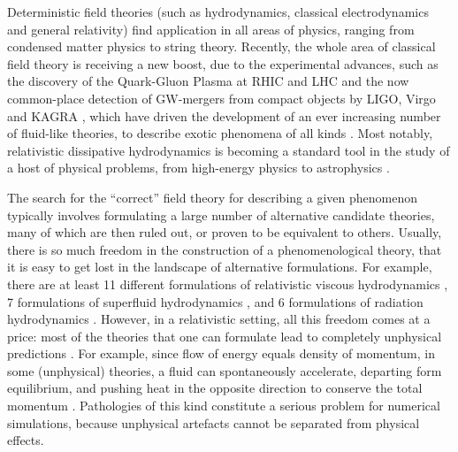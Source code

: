 \documentclass[a4paper, amsfonts, amssymb, amsmath, reprint, showkeys,  twoside, onecolumn,notitlepage,nofootinbib]{revtex4-1}
\theoremstyle{definition}
\theoremstyle{theorem}
\begin{document}

Deterministic field theories (such as hydrodynamics, classical electrodynamics and general relativity) find application in all areas of physics, ranging from condensed matter physics to string theory. Recently, the whole area of classical field theory is receiving a new boost, due to the experimental advances, such as the discovery of the Quark-Gluon Plasma at RHIC and LHC \cite{QGPreview2017} and the now common-place detection of GW-mergers from compact objects by LIGO, Virgo and KAGRA \cite{Liguz2019}, which have driven the development of an ever increasing number of fluid-like theories, to describe exotic phenomena of all kinds \cite{Heller2014,Sadoogi2018,Florskoski2019,
GavassinoKhalatnikov2021,GavassinoQuasiHydro2022}. Most notably, relativistic dissipative hydrodynamics is becoming a standard tool in the study of a host of physical problems, from high-energy physics \cite{FlorkowskiReview2018} to astrophysics \cite{Shibatuz2017,CamelioBulk1_2022,CamelioBulk2_2022}. 

The search for the ``correct'' field theory for describing a given phenomenon typically involves formulating a large number of alternative candidate theories, many of which are then ruled out, or proven to be equivalent to others. Usually, there is so much freedom in the construction of a phenomenological theory, that it is easy to get lost in the landscape of alternative formulations. For example, there are at least 11 different formulations of relativistic viscous hydrodynamics  \cite{Eckart40,landau6,Israel_Stewart_1979,LindblomRelaxation1996,Liu1986,
carter1991,BemficaDNDefinitivo2020,BaierRom2008,
Denicol2012Boltzmann,SrickerOttinger2019,VanStableFirst2012}, 7 formulations of superfluid hydrodynamics
\cite{khalatnikov_book,prix2004,cool1995,lebedev1982,
Son2001,koby2018PhRvC,Gusakov08}, and 6 formulations of radiation hydrodynamics
\cite{Thomas1930,Weinberg1971,UdeyIsrael1982,
AnileRadiazion1992,GavassinoRadiazione,Farris2008}. However, in a relativistic setting, all this freedom comes at a price: most of the theories that one can formulate lead to completely unphysical predictions \cite{Hiscock_Insatibility_first_order}. For example, since flow of energy equals density of momentum, in some (unphysical) theories, a fluid can spontaneously accelerate, departing form equilibrium, and pushing heat in the opposite direction to conserve the total momentum \cite{Hishcock1988,GavassinoLyapunov_2020}. Pathologies of this kind constitute a serious problem for numerical simulations, because unphysical artefacts cannot be separated from physical effects.
\end{document}
